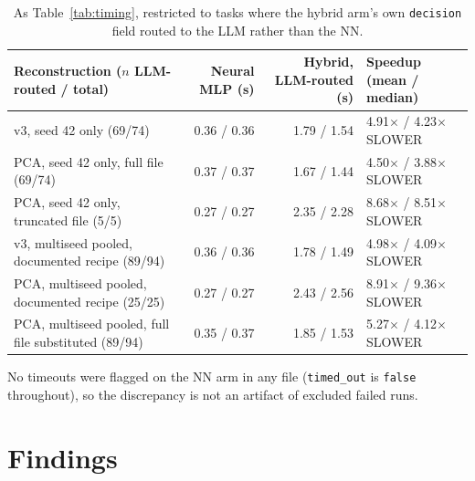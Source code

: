 \documentclass{jmlr}
\begin{document}
\begin{table}[htbp]
\centering
\small
\caption{As Table~\ref{tab:timing}, restricted to tasks where the hybrid
arm's own \texttt{decision} field routed to the LLM rather than the NN.}
\label{tab:timing_llm_routed}
\begin{tabular}{lrrl}
\toprule
Reconstruction ($n$ LLM-routed / total) & Neural MLP (s) & Hybrid, LLM-routed (s) & Speedup (mean / median) \\
\midrule
v3, seed 42 only (69/74) & 0.36 / 0.36 & 1.79 / 1.54 & 4.91$\times$ / 4.23$\times$ SLOWER \\
PCA, seed 42 only, full file (69/74) & 0.37 / 0.37 & 1.67 / 1.44 & 4.50$\times$ / 3.88$\times$ SLOWER \\
PCA, seed 42 only, truncated file (5/5) & 0.27 / 0.27 & 2.35 / 2.28 & 8.68$\times$ / 8.51$\times$ SLOWER \\
v3, multiseed pooled, documented recipe (89/94) & 0.36 / 0.36 & 1.78 / 1.49 & 4.98$\times$ / 4.09$\times$ SLOWER \\
PCA, multiseed pooled, documented recipe (25/25) & 0.27 / 0.27 & 2.43 / 2.56 & 8.91$\times$ / 9.36$\times$ SLOWER \\
PCA, multiseed pooled, full file substituted (89/94) & 0.35 / 0.37 & 1.85 / 1.53 & 5.27$\times$ / 4.12$\times$ SLOWER \\
\bottomrule
\end{tabular}
\end{table}

No timeouts were flagged on the NN arm in any file (\texttt{timed\_out}
is \texttt{false} throughout), so the discrepancy is not an artifact of
excluded failed runs.

\section{Findings}
\end{document}
